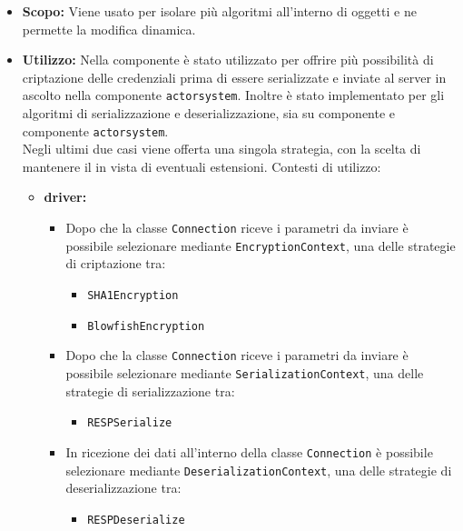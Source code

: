 \documentclass{scalatekids-article}
\begin{document}
\begin{itemize}
\item \textbf{Scopo:} Viene usato per isolare più algoritmi all'interno di oggetti e
  ne permette la modifica dinamica.
\item \textbf{Utilizzo:} Nella componente  è stato utilizzato per
  offrire più possibilità di criptazione delle credenziali prima di essere
  serializzate e inviate al server in ascolto nella componente
  \verb=actorsystem=. Inoltre è stato implementato per gli algoritmi di serializzazione
  e deserializzazione, sia su componente  e componente \verb=actorsystem=.\\
  Negli ultimi due casi viene offerta una singola strategia, con la scelta di mantenere
  il  in vista di eventuali estensioni.
  Contesti di utilizzo:
  \begin{itemize}

  \item \textbf{driver:}
    \begin{itemize}
    \item Dopo che la classe \verb=Connection= riceve i parametri da inviare è
      possibile selezionare mediante \verb=EncryptionContext=, una delle
      strategie di criptazione tra:
      \begin{itemize}
      \item \verb=SHA1Encryption=
      \item \verb=BlowfishEncryption=
      \end{itemize}
    \end{itemize}
    \begin{itemize}
    \item Dopo che la classe \verb=Connection= riceve i parametri da inviare è
      possibile selezionare mediante \verb=SerializationContext=, una delle
      strategie di serializzazione tra:
      \begin{itemize}
      \item \verb=RESPSerialize=
      \end{itemize}
    \end{itemize}
    \begin{itemize}
    \item In ricezione dei dati all'interno della classe \verb=Connection= è
      possibile selezionare mediante \verb=DeserializationContext=, una delle
      strategie di deserializzazione tra:
      \begin{itemize}
      \item \verb=RESPDeserialize=
      \end{itemize}
    \end{itemize}


\end{itemize}
\end{itemize}
\end{document}
